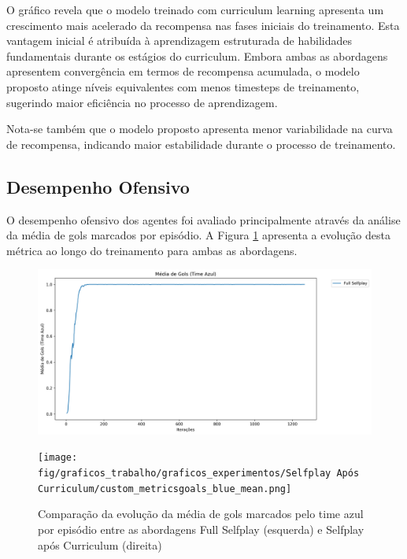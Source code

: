 O gráfico revela que o modelo treinado com curriculum learning apresenta um crescimento mais acelerado da recompensa nas fases iniciais do treinamento. Esta vantagem inicial é atribuída à aprendizagem estruturada de habilidades fundamentais durante os estágios do curriculum. Embora ambas as abordagens apresentem convergência em termos de recompensa acumulada, o modelo proposto atinge níveis equivalentes com menos timesteps de treinamento, sugerindo maior eficiência no processo de aprendizagem.

Nota-se também que o modelo proposto apresenta menor variabilidade na curva de recompensa, indicando maior estabilidade durante o processo de treinamento.

\subsection{Desempenho Ofensivo}

O desempenho ofensivo dos agentes foi avaliado principalmente através da análise da média de gols marcados por episódio. A Figura \ref{fig:goals_blue_comparison} apresenta a evolução desta métrica ao longo do treinamento para ambas as abordagens.

\begin{figure}[H]
    \centering
    \begin{minipage}{0.49\textwidth}
        \includegraphics[width=\textwidth]{fig/graficos_trabalho/graficos_experimentos/Full Selfplay/custom_metricsgoals_blue_mean.png}
    \end{minipage}
    \begin{minipage}{0.49\textwidth}
        \texttt{[image: fig/graficos\_trabalho/graficos\_experimentos/Selfplay Após Curriculum/custom\_metricsgoals\_blue\_mean.png]}
    \end{minipage}
    \caption{Comparação da evolução da média de gols marcados pelo time azul por episódio entre as abordagens Full Selfplay (esquerda) e Selfplay após Curriculum (direita)}
    \label{fig:goals_blue_comparison}
\end{figure}

